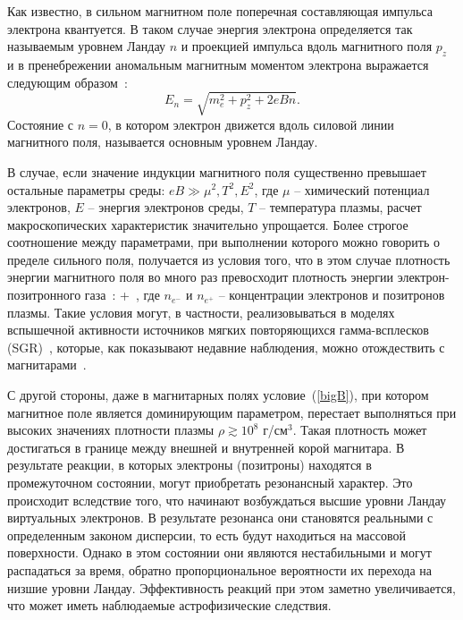 Как известно, в сильном магнитном поле поперечная составляющая импульса электрона квантуется. В таком случае энергия электрона определяется так называемым уровнем Ландау $n$ и проекцией импульса вдоль магнитного поля $p_z$ и в пренебрежении аномальным магнитным моментом электрона выражается следующим образом~\cite{Sokolov:1968}: 
\begin{equation}
E_n = \sqrt{m_e^2+p_z^2+2 e B n}.
\end{equation}
%
Состояние с $n = 0$, в котором электрон движется вдоль силовой линии магнитного поля, называется основным уровнем Ландау.

В случае, если значение индукции магнитного поля существенно превышает остальные параметры среды: $eB \gg \mu^2, T^2, E^2$, где $\mu$ -- химический потенциал электронов, $E$ -- энергия электронов среды, $T$ -- температура плазмы, расчет макроскопических характеристик значительно упрощается. Более строгое соотношение между параметрами, при выполнении которого можно говорить о пределе сильного поля, получается из условия того, что в этом случае плотность энергии магнитного поля во много раз превосходит плотность энергии электрон-позитронного газа~\cite{KuzMih:2000}: 
%
\beq
\label{bigB}
 \gg {} + \,,
\eeq 
%
\noindent где $n_{e^{-}}$ и $n_{e^{+}}$ -- концентрации электронов и позитронов плазмы. Такие условия могут, в частности, реализовываться в моделях вспышечной активности источников мягких повторяющихся гамма-всплесков 
(SGR)~\cite{Duncan:1995, Bisnovatyi:1979}, которые, как показывают недавние наблюдения, можно отождествить с магнитарами~\cite{Kouveliotou:1998ze,Kouveliotou:1998fd,Gavriil:2002mc,Ibrahim:2002zw,Ibrahim:2002zy,Olausen:2014}.

С другой стороны, даже в магнитарных полях условие~(\ref{bigB}), при котором магнитное поле является доминирующим параметром, перестает выполняться при высоких значениях плотности плазмы $\rho \gtrsim 10^8$ г/см$^3$. Такая плотность может достигаться в  границе между внешней и внутренней корой магнитара. В результате реакции, в которых электроны (позитроны) находятся в промежуточном состоянии, могут приобретать резонансный характер.
Это происходит вследствие того, что начинают возбуждаться высшие уровни Ландау виртуальных электронов. В результате резонанса они становятся реальными с определенным законом дисперсии, то есть будут находиться на массовой поверхности. 
Однако в этом состоянии они являются нестабильными и могут распадаться за время, обратно пропорциональное вероятности их перехода на низшие уровни Ландау. Эффективность реакций при этом заметно увеличивается, что 
может иметь наблюдаемые астрофизические следствия.

